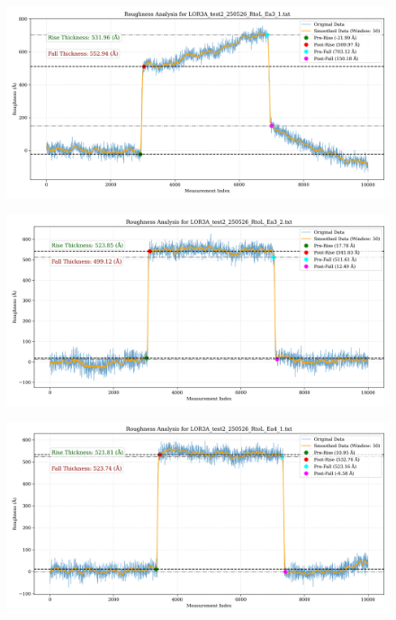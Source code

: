 \documentclass[platex,dvipdfmx,10pt,twoside,a4paper,jis2004]{jsarticle}
\begin{document}
\begin{figure}[H]
    \centering
    \includegraphics[width=\textwidth]{LOR3A_test2_250526_RtoL_Ea3_1.png}
    \label{fig:LOR3Atest2250526RtoLEa31}
\end{figure}
\begin{figure}[H]
    \centering
    \includegraphics[width=\textwidth]{LOR3A_test2_250526_RtoL_Ea3_2.png}
    \label{fig:LOR3Atest2250526RtoLEa32}
\end{figure}
\begin{figure}[H]
    \centering
    \includegraphics[width=\textwidth]{LOR3A_test2_250526_RtoL_Ea4_1.png}
    \label{fig:LOR3Atest2250526RtoLEa41}
\end{figure}
\end{document}
